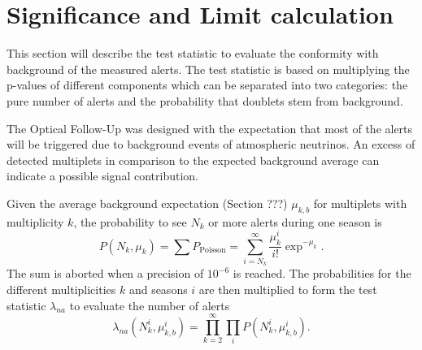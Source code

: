 \newpage
\section{Significance and Limit calculation}
This 
section will describe the test statistic to evaluate the conformity with 
background of the measured alerts.
The test statistic is based on multiplying the p-values of different 
components which can be separated into two categories: the pure number of 
alerts and the probability that doublets stem from background.

The Optical Follow-Up was designed with the expectation that most of the alerts 
will be triggered due to background events of atmospheric neutrinos. An excess 
of detected multiplets in comparison to the expected background 
average can indicate a possible signal contribution. 

Given the average 
background expectation (Section ???) $\mu_{k,b}$ for multiplets with 
multiplicity $k$, the probability to see $N_k$ or more alerts during one 
season is
\begin{equation}
 P(N_k, \mu_k) = \sum P_\text{Poisson} = \sum_{i=N_k}^\infty 
\frac{\mu_k^i}{i!}\exp^{-\mu_k}.
\end{equation}
The sum is aborted when a precision of $10^{-6}$ is reached.
The probabilities for the different multiplicities $k$ and seasons $i$ are then 
multiplied to form the test statistic $\lambda_{na}$ to evaluate the number of 
alerts
\begin{equation}
\label{eq:test_statistic}
 \lambda_{na} \left(N_k^i, \mu_{k,b}^i \right) = \prod_{k=2}^\infty \prod_i 
P(N_k^i, 
\mu_{k,b}^i).
\end{equation}

